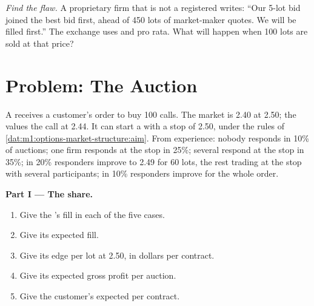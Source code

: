 \begin{exercise}[$\star\star\star$]\label{exo:m1:options-market-structure:8}
\emph{Find the flaw.} A proprietary firm that is not a registered  writes: ``Our 5-lot bid joined the best bid first, ahead of 450 lots of
market-maker quotes. We will be filled first.'' The exchange uses  and pro rata. What will happen when 100 lots are sold at that
price?
\end{exercise}

\section{Problem: The Auction}

\begin{problem}\label{pb:m1:options-market-structure:1}
A  receives a customer's order to buy 100 calls. The market is 2.40
at 2.50; the  values the call at 2.44. It can start a
 with a stop of 2.50, under the rules of
\cref{dat:m1:options-market-structure:aim}. From experience: nobody responds
in 10\% of auctions; one firm responds at the stop in 25\%; several respond at
the stop in 35\%; in 20\% responders improve to 2.49 for 60 lots, the rest
trading at the stop with several participants; in 10\% responders improve for
the whole order.

\medskip\noindent\textbf{Part I --- The share.}
\begin{enumerate}
\item Give the 's fill in each of the five cases.
\item Give its expected fill.
\item Give its edge per lot at 2.50, in dollars per contract.
\item Give its expected gross profit per auction.
\item Give the customer's expected  per contract.
\end{enumerate}


\end{problem}
